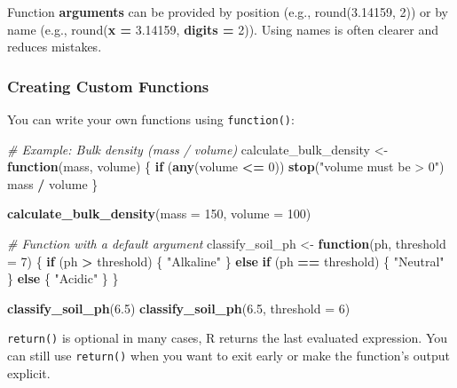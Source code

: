 \documentclass[
  10pt,
  b5paper,
  oneside]{book}
\newenvironment{Shaded}{\begin{snugshade}}{\end{snugshade}}
\newcommand{\AttributeTok}[1]{\textcolor[rgb]{0.13,0.29,0.53}{#1}}
\newcommand{\CommentTok}[1]{\textcolor[rgb]{0.56,0.35,0.01}{\textit{#1}}}
\newcommand{\ControlFlowTok}[1]{\textcolor[rgb]{0.13,0.29,0.53}{\textbf{#1}}}
\newcommand{\DecValTok}[1]{\textcolor[rgb]{0.00,0.00,0.81}{#1}}
\newcommand{\FloatTok}[1]{\textcolor[rgb]{0.00,0.00,0.81}{#1}}
\newcommand{\FunctionTok}[1]{\textcolor[rgb]{0.13,0.29,0.53}{\textbf{#1}}}
\newcommand{\NormalTok}[1]{#1}
\newcommand{\OtherTok}[1]{\textcolor[rgb]{0.56,0.35,0.01}{#1}}
\newcommand{\SpecialCharTok}[1]{\textcolor[rgb]{0.81,0.36,0.00}{\textbf{#1}}}
\newcommand{\StringTok}[1]{\textcolor[rgb]{0.31,0.60,0.02}{#1}}
\begin{document}
Function \textbf{arguments} can be provided by position (e.g., round(3.14159, 2)) or by name (e.g., round(\textbf{x =} 3.14159, \textbf{digits =} 2)).
Using names is often clearer and reduces mistakes.

\subsubsection{Creating Custom Functions}\label{build-functions}

You can write your own functions using \texttt{function()}:

\begin{Shaded}
\begin{Highlighting}[]
\CommentTok{\# Example: Bulk density (mass / volume)}
\NormalTok{calculate\_bulk\_density }\OtherTok{\textless{}{-}} \ControlFlowTok{function}\NormalTok{(mass, volume) \{}
  \ControlFlowTok{if}\NormalTok{ (}\FunctionTok{any}\NormalTok{(volume }\SpecialCharTok{\textless{}=} \DecValTok{0}\NormalTok{)) }\FunctionTok{stop}\NormalTok{(}\StringTok{"volume must be \textgreater{} 0"}\NormalTok{)}
\NormalTok{  mass }\SpecialCharTok{/}\NormalTok{ volume}
\NormalTok{\}}

\FunctionTok{calculate\_bulk\_density}\NormalTok{(}\AttributeTok{mass =} \DecValTok{150}\NormalTok{, }\AttributeTok{volume =} \DecValTok{100}\NormalTok{)}

\CommentTok{\# Function with a default argument}
\NormalTok{classify\_soil\_ph }\OtherTok{\textless{}{-}} \ControlFlowTok{function}\NormalTok{(ph, }\AttributeTok{threshold =} \DecValTok{7}\NormalTok{) \{}
  \ControlFlowTok{if}\NormalTok{ (ph }\SpecialCharTok{\textgreater{}}\NormalTok{ threshold) \{}
    \StringTok{"Alkaline"}
\NormalTok{  \} }\ControlFlowTok{else} \ControlFlowTok{if}\NormalTok{ (ph }\SpecialCharTok{==}\NormalTok{ threshold) \{}
    \StringTok{"Neutral"}
\NormalTok{  \} }\ControlFlowTok{else}\NormalTok{ \{}
    \StringTok{"Acidic"}
\NormalTok{  \}}
\NormalTok{\}}

\FunctionTok{classify\_soil\_ph}\NormalTok{(}\FloatTok{6.5}\NormalTok{)}
\FunctionTok{classify\_soil\_ph}\NormalTok{(}\FloatTok{6.5}\NormalTok{, }\AttributeTok{threshold =} \DecValTok{6}\NormalTok{)}
\end{Highlighting}
\end{Shaded}

\texttt{return()} is optional in many cases, R returns the last evaluated expression.
You can still use \texttt{return()} when you want to exit early or make the function's output explicit.
\end{document}
